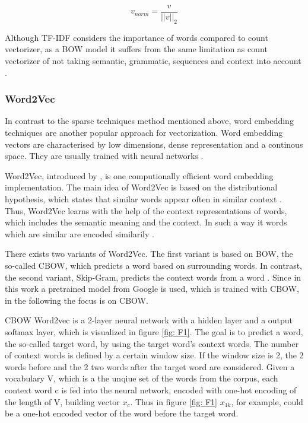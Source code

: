 \documentclass[12pt, a4paper, titlepage]{article}
\begin{document}
\[v_{norm} = \frac{v}{||v||_2} \]

Although \ac{TF-IDF} considers the importance of words compared to count vectorizer, as a \ac{BOW} model it suffers from the same limitation as count vectorizer of not taking semantic, grammatic, sequences and context into account \citep{sarkar2016}. 

\subsubsection*{Word2Vec}
In contrast to the sparse techniques method mentioned above, word embedding techniques are another popular approach for vectorization. Word embedding vectors are characterised by low dimensions, dense representation and a continous space. They are usually trained with neural networks \citep{li2015, jin2016}. 

Word2Vec, introduced by \citet{mikolov2013}, is one computionally efficient word embedding implementation. The main idea of Word2Vec is based on the distributional hypothesis, which states that similar words appear often in similar context \citep{sahlgren2008}. Thus, Word2Vec learns with the help of the context representations of words, which includes the semantic meaning and the context. In such a way it words which are similar are encoded similarily \citep{sarkar2016}. 

There exists two variants of Word2Vec. The first variant is based on \ac{BOW}, the so-called \ac{CBOW}, which predicts a word based on surrounding words. In contrast, the second variant, Skip-Gram, predicts the context words from a word \citep{ajose2020, sarkar2016}. Since in this work a pretrained model from Google is used, which is trained with CBOW, in the following the focus is on \ac{CBOW}. 

\ac{CBOW} Word2vec is a 2-layer neural network with a hidden layer and a output softmax layer, which is visualized in figure \ref{fig: F1}. The goal is to predict a word, the so-called target word, by using the target word's context words. The number of context words is defined by a certain window size. If the window size is 2, the 2 words before and the 2 two words after the target word are considered. Given a vocabulary V, which is a the unqiue set of the words from the corpus, each context word c is fed into the neural network, encoded with one-hot encoding of the length of V, building vector $x_c$. Thus in figure \ref*{fig: F1} $x_{1k}$, for example, could be a one-hot encoded vector of the word before the target word. 
\end{document}
